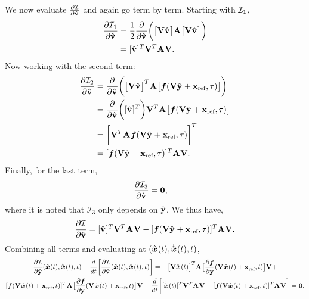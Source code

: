 \documentclass[3p,computermodern,10pt]{elsarticle}
\begin{document}
\begin{appendices}
$$$$%
We now evaluate $\frac{\partial \mathcal{I}}{\partial \hat{\mathbf{v}}^{}}$ and again go term by term. Starting with $\mathcal{I}_1$,
\begin{align*}
\frac{\partial \mathcal{I}_1}{\partial \hat{\mathbf{v}}^{}} &=
\frac{1}{2} \frac{\partial}{\partial \hat{\mathbf{v}}^{} }\bigg( \big[ \mathbf {V} \hat{\mathbf{v}}^{} \big]  \mathbf{A}^{}  \big[ \mathbf {V} \hat{\mathbf{v}}^{} \big]  \bigg) \\
&= [\hat{\mathbf{v}}^{}]^T \mathbf {V}^T \mathbf{A}^{} \mathbf {V}.
\end{align*}
Now working with the second term:
\begin{align*}
\frac{\partial \mathcal{I}_2}{\partial \hat{\mathbf{v}}^{} } &=
\frac{\partial}{\partial \hat{\mathbf{v}}^{}  } \bigg( \big[ \mathbf {V} \hat{\mathbf{v}}^{} \big]^T \mathbf{A}^{} \big[ \boldsymbol f(\mathbf {V} \hat{\mathbf{y}}^{} + \mathbf{x}_\text{ref},\tau) \big]  \bigg)\\
 &= \frac{\partial}{\partial \hat{\mathbf{v}}^{} } \bigg( [\hat{\mathbf{v}}^{}]^T \bigg) \mathbf {V}^T  \mathbf{A}^{} \big[ \boldsymbol f(\mathbf {V} \hat{\mathbf{y}}^{} + \mathbf{x}_\text{ref},\tau) \big] \\ 
 &= \bigg[  \mathbf {V}^T  \mathbf{A}^{}  \boldsymbol f(\mathbf {V} \hat{\mathbf{y}}^{} + \mathbf{x}_\text{ref},\tau )   \bigg]^T \\
 &= [\boldsymbol f(\mathbf {V} \hat{\mathbf{y}}^{} + \mathbf{x}_\text{ref},\tau) ]^T \mathbf{A}^{} \mathbf {V}.
\end{align*}
Finally, for the last term,
\begin{align*}
\frac{\partial \mathcal{I}_3}{\partial \hat{\mathbf{v}}^{} } &= \boldsymbol 0,
\end{align*}
where it is noted that $\mathcal{I}_3$ only depends on $\hat{\mathbf{y}}$. We thus have,
$$\frac{\partial \mathcal{I}}{\partial \hat{\mathbf{v}} } =   [\hat{\mathbf{v}}^{}]^T \mathbf {V}^T \mathbf{A}^{} \mathbf {V} -  [\boldsymbol f(\mathbf {V} \hat{\mathbf{y}}^{} + \mathbf{x}_\text{ref},\tau ) ]^T \mathbf{A}^{} \mathbf {V}.$$
Combining all terms and evaluating at $(\hat{ \boldsymbol x}^{}(t),\dot{\hat{ \boldsymbol x}}^{}(t),t)$,
\begin{multline*}
 \frac{\partial \minintegrand}{\partial \genstateyDiscrete}(\genstateArg{}{t},\genstateDotArg{}{t},t)  - \frac{d}{dt} \bigg[ \frac{\partial \minintegrand}{\partial \genstateyDiscreteDotArgnt{}} (\genstateArg{}{t},\genstateDotArg{}{t},t) \bigg] =  - \big[ \basisspace \genstateDotArg{}{t}  \big]^T \stweightingMatArg{} \big[  \frac{\partial \velocity}{\partial \stateyDiscrete} (\veloargsrom) \big] \basisspace + \\  [\velocity(\veloargsrom) ]^T \stweightingMatArg{} \big[ \frac{\partial \velocity}{\partial \stateyDiscrete} (\veloargsrom) \big] \basisspace - \frac{d}{dt} \bigg[  [\genstateDotArg{}{t} ]^T  \basisspace^T \stweightingMatArg{} \basisspace - [\velocity(\veloargsrom) ]^T \stweightingMatArg{} \basisspace \bigg]  = \boldsymbol 0.

\end{multline*}
\end{appendices}
\end{document}
